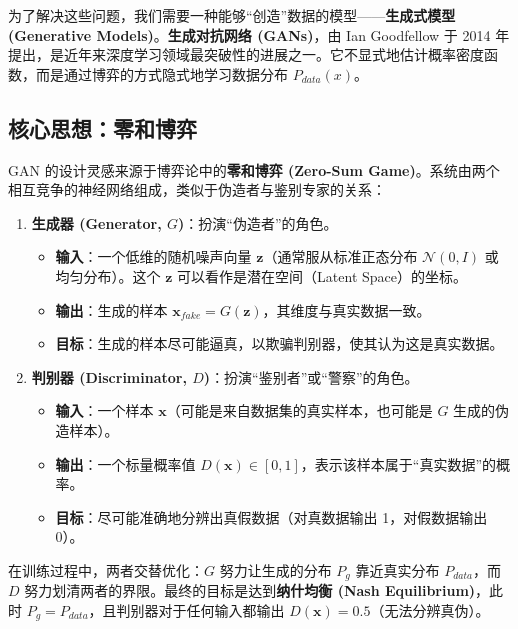 为了解决这些问题，我们需要一种能够“创造”数据的模型——\textbf{生成式模型 (Generative Models)}。\textbf{生成对抗网络 (GANs)}，由 Ian Goodfellow 于 2014 年提出，是近年来深度学习领域最突破性的进展之一。它不显式地估计概率密度函数，而是通过博弈的方式隐式地学习数据分布 $P_{data}(x)$。







\subsection{核心思想：零和博弈}

GAN 的设计灵感来源于博弈论中的\textbf{零和博弈 (Zero-Sum Game)}。系统由两个相互竞争的神经网络组成，类似于伪造者与鉴别专家的关系：

\begin{enumerate}
    \item \textbf{生成器 (Generator, $G$)}：扮演“伪造者”的角色。
    \begin{itemize}
        \item \textbf{输入}：一个低维的随机噪声向量 $\mathbf{z}$（通常服从标准正态分布 $\mathcal{N}(0, I)$ 或均匀分布）。这个 $\mathbf{z}$ 可以看作是潜在空间（Latent Space）的坐标。
        \item \textbf{输出}：生成的样本 $\mathbf{x}_{fake} = G(\mathbf{z})$，其维度与真实数据一致。
        \item \textbf{目标}：生成的样本尽可能逼真，以欺骗判别器，使其认为这是真实数据。
    \end{itemize}

    \item \textbf{判别器 (Discriminator, $D$)}：扮演“鉴别者”或“警察”的角色。
    \begin{itemize}
        \item \textbf{输入}：一个样本 $\mathbf{x}$（可能是来自数据集的真实样本，也可能是 $G$ 生成的伪造样本）。
        \item \textbf{输出}：一个标量概率值 $D(\mathbf{x}) \in [0, 1]$，表示该样本属于“真实数据”的概率。
        \item \textbf{目标}：尽可能准确地分辨出真假数据（对真数据输出 1，对假数据输出 0）。
    \end{itemize}
\end{enumerate}

在训练过程中，两者交替优化：$G$ 努力让生成的分布 $P_g$ 靠近真实分布 $P_{data}$，而 $D$ 努力划清两者的界限。最终的目标是达到\textbf{纳什均衡 (Nash Equilibrium)}，此时 $P_g = P_{data}$，且判别器对于任何输入都输出 $D(\mathbf{x}) = 0.5$（无法分辨真伪）。



